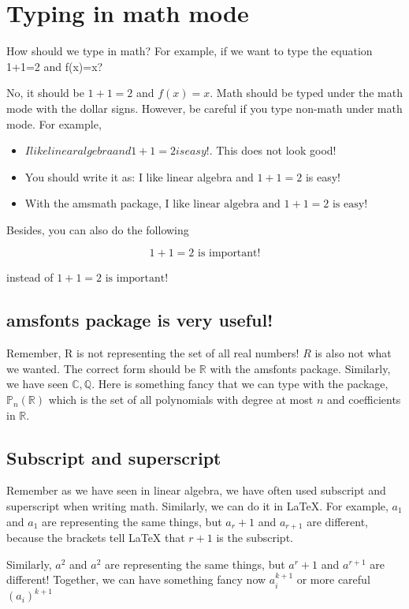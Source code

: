 \documentclass{article}
\begin{document}
\section{Typing in math mode}
How should we type in math? For example, if we want to type the equation 1+1=2 and f(x)=x?

No, it should be $1+1=2$ and $f(x)=x$. Math should be typed under the math mode with the dollar signs. However, be careful if you type non-math under math mode. For example,

\begin{itemize}
    \item $I like linear algebra and 1+1=2 is easy!$. This does not look good!
    \item You should write it as: I like linear algebra and $1+1=2$ is easy!
    \item With the amsmath package, $\text{I like linear algebra and } 1+1=2 \text{ is easy!}$
\end{itemize}
    
Besides, you can also do the following 

$$
1+1=2 \text{ is important!}
$$

instead of $1+1=2 \text{ is important!}$

\subsection{amsfonts package is very useful!}
Remember, R is not representing the set of all real numbers! $R$ is also not what we wanted. The correct form should be $\mathbb{R}$ with the amsfonts package. Similarly, we have seen $\mathbb{C}, \mathbb{Q}$. Here is something fancy that we can type with the package, $\mathbb{P}_n(\mathbb{R})$ which is the set of all polynomials with degree at most $n$ and coefficients in $\mathbb{R}$.

\subsection{Subscript and superscript}
Remember as we have seen in linear algebra, we have often used subscript and superscript when writing math. Similarly, we can do it in LaTeX. For example,
$a_1$ and $a_{1}$ are representing the same things, but $a_r+1$ and $a_{r+1}$ are different, because the brackets tell LaTeX that $r+1$ is the subscript.

Similarly, $a^2$ and $a^{2}$ are representing the same things, but $a^r+1$ and $a^{r+1}$ are different! Together, we can have something fancy now 
$a_{i}^{k+1}$ or more careful $(a_{i})^{k+1}$
\end{document}
